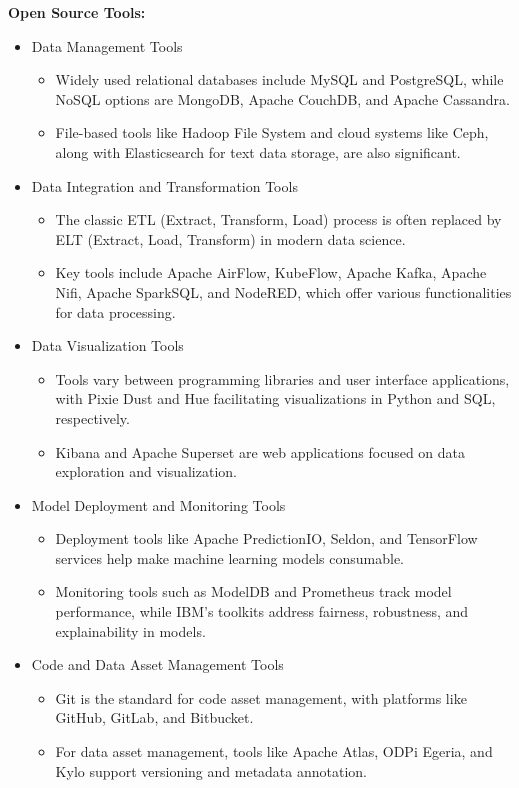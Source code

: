 \documentclass[12pt]{report} %
\begin{document}
		\noindent \textbf{Open Source Tools:}
		\begin{itemize}
			\item Data Management Tools
				\begin{itemize}
					\item Widely used relational databases include MySQL and PostgreSQL, while NoSQL options are MongoDB, Apache CouchDB, and Apache Cassandra.
					\item File-based tools like Hadoop File System and cloud systems like Ceph, along with Elasticsearch for text data storage, are also significant.
				\end{itemize}
			\item Data Integration and Transformation Tools
			\begin{itemize}
				\item  The classic ETL (Extract, Transform, Load) process is often replaced by ELT (Extract, Load, Transform) in modern data science.
				\item  Key tools include Apache AirFlow, KubeFlow, Apache Kafka, Apache Nifi, Apache SparkSQL, and NodeRED, which offer various functionalities for data processing.
			\end{itemize}
			\item Data Visualization Tools
				\begin{itemize}
					\item  	Tools vary between programming libraries and user interface applications, with Pixie Dust and Hue facilitating visualizations in Python and SQL, respectively.
					\item  Kibana and Apache Superset are web applications focused on data exploration and visualization.
				\end{itemize}
			\item Model Deployment and Monitoring Tools
			\begin{itemize}
				\item  	Deployment tools like Apache PredictionIO, Seldon, and TensorFlow services help make machine learning models consumable.
				\item  Monitoring tools such as ModelDB and Prometheus track model performance, while IBM's toolkits address fairness, robustness, and explainability in models.
			\end{itemize}
			\item Code and Data Asset Management Tools
			\begin{itemize}
				\item  	Git is the standard for code asset management, with platforms like GitHub, GitLab, and Bitbucket.
				\item  For data asset management, tools like Apache Atlas, ODPi Egeria, and Kylo support versioning and metadata annotation.
			\end{itemize}
		\end{itemize}
	
\end{document}
